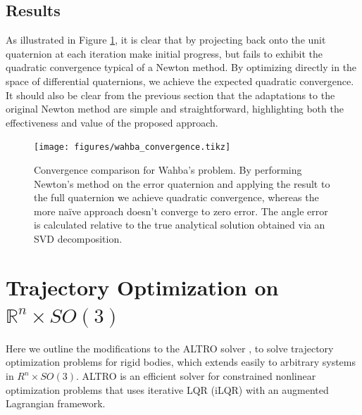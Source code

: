 \documentclass[letterpaper, 10 pt, conference]{ieeeconf}  %
\newcommand{\R}{\mathbb{R}}
\begin{document}
    \subsection{Results}
    As illustrated in Figure \ref{fig:wahba_convergence}, it is clear that by projecting 
    back onto the unit quaternion at each iteration make initial progress, but fails to 
    exhibit the quadratic convergence typical of a Newton method. By optimizing directly 
    in the space of differential quaternions, we achieve the expected quadratic convergence.
    It should also be clear from the previous section that the adaptations to the original
    Newton method are simple and straightforward, highlighting both the effectiveness and
    value of the proposed approach.
    \begin{figure}

        \centering
        \texttt{[image: figures/wahba\_convergence.tikz]}
        \caption{Convergence comparison for Wahba's problem. By performing Newton's method
        on the error quaternion and applying the result to the full quaternion we achieve
        quadratic convergence, whereas the more na\"ive approach doesn't converge to zero
        error. The angle error is calculated relative to the true analytical solution obtained
        via an SVD decomposition.}
        \label{fig:wahba_convergence}
    \end{figure}

\section{Trajectory Optimization on $\R^n \times SO(3)$} \label{sec:trajopt}
    Here we outline the modifications to the ALTRO solver \cite{howell2019altro}, to
    solve trajectory optimization problems for rigid bodies, which extends easily to
    arbitrary systems in $R^n \times SO(3)$. ALTRO is an efficient solver for constrained
    nonlinear optimization problems that uses iterative LQR (iLQR) with an augmented
    Lagrangian framework.
\end{document}
